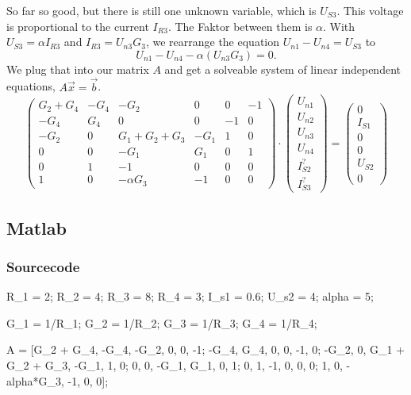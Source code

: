 {So far so good, but there is still one unknown variable, which is $U_{S3}$. This voltage is
proportional to the current $I_{R3}$. The Faktor between them is $\alpha$. With $U_{S3} = \alpha
I_{R3}$ and $I_{R3} = U_{n3}G_3$, we rearrange the equation $U_{n1} - U_{n4} = U_{S3}$ to
\[
   U_{n1} - U_{n4} - \alpha (U_{n3} G_3) = 0
.\]
We plug that into our matrix $A$ and get a solveable system of linear independent equations, $A
\vec{x} = \vec{b}$.
\begin{equation}
\begin{pmatrix}
   G_2 + G_4 & -G_4 & -G_2 & 0 & 0 & -1 \\
   -G_4 & G_4 & 0 & 0 & -1 & 0 \\
   -G_2 & 0 & G_1+G_2+G_3 & -G_1 & 1 & 0 \\
   0 & 0 & -G_1 & G_1 & 0 & 1 \\ 
   0 & 1 & -1 & 0 & 0 & 0 \\
   1 & 0 & -\alpha G_3 & -1 & 0 & 0 
\end{pmatrix}
\cdot
\begin{pmatrix}
   U_{n1} \\ U_{n2} \\ U_{n3} \\ U_{n4} \\ I_{S2}^? \\ I_{S3}^?
\end{pmatrix}
=
\begin{pmatrix}
   0 \\ I_{S1} \\ 0 \\ 0 \\ U_{S2} \\ 0
\end{pmatrix}
\label{eqn:final_matrix}
\end{equation}

\subsection{Matlab}
\subsubsection{Sourcecode}
\begin{matlabcode}
R_1 = 2; R_2 = 4; R_3 = 8; R_4 = 3;
I_s1 = 0.6; U_s2 = 4; alpha = 5;

G_1 = 1/R_1; G_2 = 1/R_2; G_3 = 1/R_3; G_4 = 1/R_4;

A = [G_2 + G_4, -G_4, -G_2, 0, 0, -1;
    -G_4, G_4, 0, 0, -1, 0;
    -G_2, 0, G_1 + G_2 + G_3, -G_1, 1, 0;
    0, 0, -G_1, G_1, 0, 1;
    0, 1, -1, 0, 0, 0;
    1, 0, -alpha*G_3, -1, 0, 0];


\end{matlabcode}}
